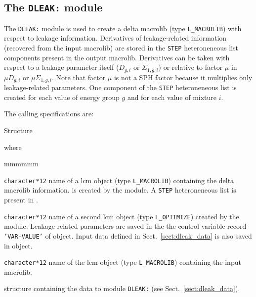 \subsection{The {\tt DLEAK:} module}

The {\tt DLEAK:} module is used to create a delta {\sc macrolib} (type {\tt L\_MACROLIB}) with respect to leakage information.
Derivatives of leakage-related information (recovered from the input {\sc macrolib}) are stored in the {\tt STEP} heteroneneous list components
present in the output {\sc macrolib}. Derivatives can be taken with respect to a leakage parameter itself
($D_{g,i}$ or $\Sigma_{1,g,i}$) or relative to factor $\mu$ in $\mu D_{g,i}$ or $\mu\Sigma_{1,g,i}$. Note that factor $\mu$ is not a
SPH factor because it multiplies only leakage-related parameters. One component of the
{\tt STEP} heteroneneous list is created for each value of energy group $g$ and for each value of mixture $i$.

\vskip 0.08cm

The calling specifications are:

\begin{DataStructure}{Structure }
  \moc{:=}   \moc{::} 
\end{DataStructure}

\goodbreak
\noindent where

\begin{ListeDeDescription}{mmmmmm}

\item[\dusa{DMACRO}] {\tt character*12} name of a {\sc lcm} object (type {\tt L\_MACROLIB}) containing the delta {\sc macrolib}
information.  is created by the module. A {\tt STEP} heteroneneous list is present in .

\item[\dusa{OPTIM}] {\tt character*12} name of a second {\sc lcm} object (type {\tt L\_OPTIMIZE}) created by the module. Leakage-related parameters are saved
in the the control variable record {\tt 'VAR-VALUE'} of  object. Input data defined in Sect.~\ref{sect:dleak_data} is
also saved in  object.

\item[\dusa{MACRO}] {\tt character*12} name of the {\sc lcm} object (type {\tt L\_MACROLIB}) containing the input {\sc macrolib}.

\item[\dstr{dleak\_data}] structure containing the data to module {\tt DLEAK:} (see Sect.~\ref{sect:dleak_data}).

\end{ListeDeDescription}

